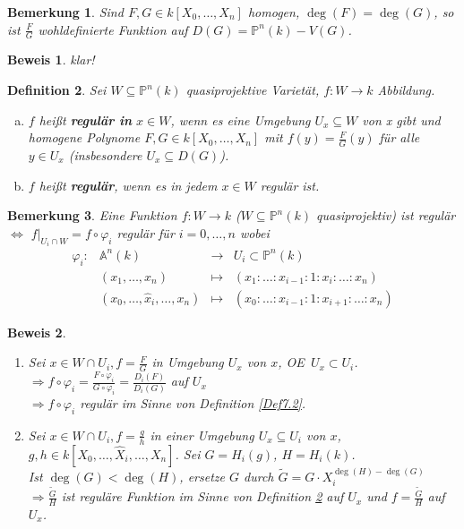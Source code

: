 \documentclass[a4paper,12pt]{report}
\theoremstyle{break}
\newtheorem{Def}{Definition}[section]
\newtheorem{Bem}[Def]{Bemerkung}
\theoremstyle{nonumberbreak}
\newtheorem{Bew}{Beweis}
\theoremstyle{nonumberplain}
\newcommand{\quot}[1]{\textrm{\glqq}{#1}\textrm{\grqq}}
\newcommand{\emp}[1]{\textbf{\emph{#1}}}
\newcommand{\begriff}[1]{{\index{#1}}\emp{#1}}
\newenvironment{twosidedproof}{\begin{enumerate}[\quot{$\Rightarrow$}:]}{\end{enumerate}}
\newcommand{\proofforward}{\item[\quot{$\Rightarrow$}:]}
\newcommand{\proofreverse}{\item[\quot{$\Leftarrow$}:]}
\newcommand{\A}{\mathbb{A}}
\newcommand{\IP}{\mathbb{P}}%
\renewcommand{\OE}{O\!\!E~}
\begin{document}
\begin{Bem}
Sind $F,G\in k[X_0,\ldots ,X_n]$ homogen, $\deg(F)=\deg(G)$, so ist $\frac{F}{G}$ wohldefinierte Funktion auf $D(G)=\IP^n(k)-V(G)$.
\end{Bem}

\begin{Bew}
klar!
\end{Bew}

\begin{Def}\label{Def12.2}
Sei $W\subseteq\IP^n(k)$ quasiprojektive Variet\"at, $f:W\to k$ Abbildung.\begin{enumerate}[a)]
\item
	$f$ hei\ss t \begriff{regul\"ar in} $x\in W$, wenn es eine Umgebung $U_x\subseteq W$ von x gibt und homogene Polynome $F, G \in k[X_0,\ldots ,X_n]$ mit $f(y)=\frac{F}{G}(y)$ f\"ur alle $y\in U_x$ (insbesondere $U_x\subseteq D(G)$).

\item
	$f$ hei\ss t \begriff{regul\"ar}, wenn es in jedem $x\in W$ regul\"ar ist.
\end{enumerate}\end{Def}

\begin{Bem}
Eine Funktion $f:W \to k$ ($W\subseteq\IP^n(k)$ quasiprojektiv) ist regul\"ar $\Leftrightarrow$ $f|_{U_i\cap W}=f\circ \varphi_i$ regul\"ar f\"ur $i=0,\ldots ,n$ wobei
	\[\begin{array}{lrcl}
		\varphi_i: & \A^n(k) &\to& U_i\subset \IP^n(k)\\
		& (x_1,\ldots ,x_n) & \mapsto & (x_1:\ldots :x_{i-1}:1:x_i:\ldots :x_n)\\
		& (x_0,\ldots ,\hat x_i,\ldots ,x_n) &\mapsto& (x_0:\ldots :x_{i-1}:1:x_{i+1}:\ldots :x_n)
	\end{array}\]
\end{Bem}

\begin{Bew}\begin{twosidedproof}
\proofforward
	Sei  $x\in W\cap U_i, f=\frac{F}{G}$ in Umgebung $U_x$ von $x$, \OE $U_x\subset U_i$.\\
	$\Rightarrow f\circ \varphi_i=\frac{F\circ \varphi_i}{G\circ \varphi_i}=\frac{D_i(F)}{D_i(G)}$ auf $U_x$\\
	$\Rightarrow f\circ \varphi_i$ regul\"ar im Sinne von Definition \ref{Def7.2}.
\proofreverse
	Sei $x\in W\cap U_i, f=\frac{g}{h}$ in einer Umgebung $U_x\subseteq U_i$ von $x$, $g,h\in k[X_0,\ldots ,\widehat X_i,\ldots ,X_n]$. Sei $G=H_i(g)$, $H=H_i(k)$.\\
	Ist $\deg(G)<\deg(H)$, ersetze $G$ durch $\widetilde G=G\cdot X_i^{\deg(H)-\deg(G)}$\\
	$\Rightarrow \frac{\widetilde G}{H}$ ist regul\"are Funktion im Sinne von Definition \ref{Def12.2} auf $U_x$ und $f=\frac{\widetilde G}{H}$ auf $U_x$.
\end{twosidedproof}\end{Bew}
\end{document}
